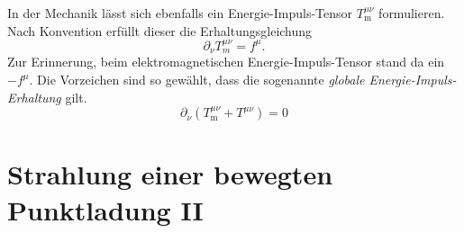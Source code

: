 In der Mechanik lässt sich ebenfalls ein Energie-Impuls-Tensor $T^{\mu\nu}_\text{m}$ formulieren. Nach Konvention erfüllt dieser die Erhaltungsgleichung 
\begin{equation*}
\partial_\nu T_m^{\mu\nu} = f^\mu.
\end{equation*}
Zur Erinnerung, beim elektromagnetischen Energie-Impuls-Tensor stand da ein $-f^\mu$. Die Vorzeichen sind so gewählt, dass die sogenannte \emph{globale Energie-Impuls-Erhaltung} gilt.
\begin{equation*}
\partial_\nu\left(T_\text{m}^{\mu\nu} + T^{\mu\nu}\right) = 0
\end{equation*}

\section{Strahlung einer bewegten Punktladung II}

